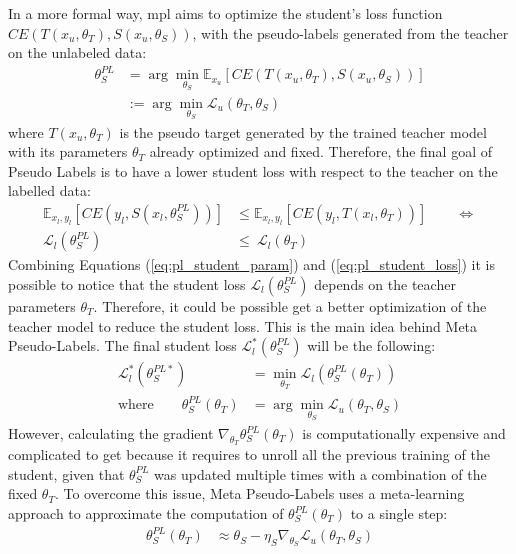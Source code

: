 In a more formal way, \acl{mpl} aims to optimize the student's 
loss function $CE(T(x_u, \theta_T), S(x_u, \theta_S))$, with the pseudo-labels 
generated from the teacher on the unlabeled data:
\begin{align}
    \theta_S^{PL} &= \arg \min_{\theta_S} \mathbb{E}_{x_u}\left[
        {CE(T(x_u, \theta_T), S(x_u, \theta_S))}\right] 
        \label{eq:pl_student_param}\\
        &:=
        \arg \min_{\theta_S} \mathcal{L}_u(\theta_T, \theta_S) \nonumber
\end{align}
where $T(x_u, \theta_T)$ is the pseudo target generated by the trained teacher 
model with its parameters $\theta_T$ already optimized and fixed. 
Therefore, the final goal of 
Pseudo Labels is to have a lower student loss with respect to the teacher on 
the labelled data:
\begin{align}
    \mathbb{E}_{x_l, y_l}\left[CE(y_l, S(x_l, \theta_S^{PL}))\right]
    &\leq
    \mathbb{E}_{x_l, y_l}\left[CE(y_l, T(x_l, \theta_T))\right]
    \qquad \Longleftrightarrow 
    \label{eq:pl_student_loss}\\
    \mathcal{L}_l(\theta_S^{PL})
    &\leq\
    \mathcal{L}_l(\theta_T) 
    \nonumber
\end{align}
Combining Equations (\ref{eq:pl_student_param}) and (\ref{eq:pl_student_loss}) 
it is possible to notice that the student loss $\mathcal{L}_l(\theta_S^{PL})$ 
depends on the teacher parameters $\theta_T$. Therefore, it could be possible 
get a better optimization of the teacher model to reduce the student loss. 
This is the main idea behind Meta Pseudo-Labels.
The final student loss $\mathcal{L}_l^*(\theta_S^{PL})$ will be the following:
\begin{align}
    \mathcal{L}^*_l(\theta_S^{PL*}) &= \min_{\theta_T} \mathcal{L}_l(\theta_S^{PL}(\theta_T))
    \label{eq:pl_student_loss_final} \\
    \text{where} \qquad \theta_S^{PL}(\theta_T) &= \arg\min_{\theta_S} \mathcal{L}_u(\theta_T, \theta_S)
    \nonumber
\end{align}
However, calculating the gradient $\nabla_{\theta_T}\theta^{PL}_S(\theta_T)$ 
is computationally expensive and complicated to get because it requires to 
unroll all the previous training of the student, given that $\theta_S^{PL}$ was updated 
multiple times with a combination of the fixed $\theta_T$.
To overcome this issue, Meta Pseudo-Labels uses a meta-learning approach to 
approximate  
the computation of $\theta_S^{PL}(\theta_T)$ to a single step:
\begin{align}
    \theta_S^{PL}(\theta_T) &\approx \theta_S - \eta_S \nabla_{\theta_S} \mathcal{L}_u(\theta_T, \theta_S)
    \label{eq:pl_student_update}
\end{align}
